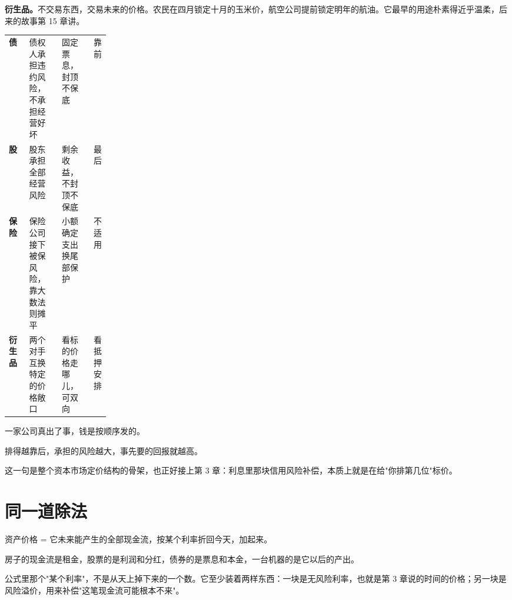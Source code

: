 \textbf{衍生品。}不交易东西，交易未来的价格。农民在四月锁定十月的玉米价，航空公司提前锁定明年的航油。它最早的用途朴素得近乎温柔，后来的故事第 15 章讲。

\begin{tablewrap}
\begin{xltabular}{\linewidth}{>{\raggedright\arraybackslash}p{0.20\linewidth}XXr}
\toprule
{} &  &  &  \\
\midrule
\textbf{债} & 债权人承担违约风险，不承担经营好坏 & 固定票息，封顶不保底 & 靠前 \\
\textbf{股} & 股东承担全部经营风险 & 剩余收益，不封顶不保底 & 最后 \\
\textbf{保险} & 保险公司接下被保风险，靠大数法则摊平 & 小额确定支出换尾部保护 & 不适用 \\
\textbf{衍生品} & 两个对手互换特定的价格敞口 & 看标的价格走哪儿，可双向 & 看抵押安排 \\
\bottomrule
\end{xltabular}
\end{tablewrap}

一家公司真出了事，钱是按顺序发的。

\begin{chainflow}
\chainarrow {}\chainarrow {}\chainarrow {}\chainarrow {}\chainarrow {}
\end{chainflow}

排得越靠后，承担的风险越大，事先要的回报就越高。

这一句是整个资本市场定价结构的骨架，也正好接上第 3 章：利息里那块信用风险补偿，本质上就是在给"你排第几位"标价。

\section{同一道除法}

\begin{pullquote}{}
资产价格 = 它未来能产生的全部现金流，按某个利率折回今天，加起来。
\end{pullquote}

房子的现金流是租金，股票的是利润和分红，债券的是票息和本金，一台机器的是它以后的产出。

公式里那个"某个利率"，不是从天上掉下来的一个数。它至少装着两样东西：一块是无风险利率，也就是第 3 章说的时间的价格；另一块是风险溢价，用来补偿"这笔现金流可能根本不来"。

